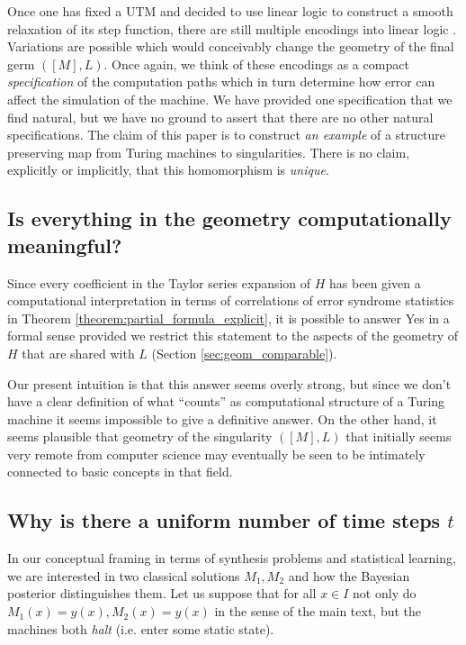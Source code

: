 \documentclass[english,letter paper,12pt,reqno]{article}
\theoremstyle{definition}
\begin{document}
Once one has fixed a UTM and decided to use linear logic to construct a smooth relaxation of its step function, there are still multiple encodings into linear logic \cite{clift2020encodings}. Variations are possible which would conceivably change the geometry of the final germ $([M], L)$. Once again, we think of these encodings as a compact \emph{specification} of the computation paths which in turn determine how error can affect the simulation of the machine. We have provided one specification that we find natural, but we have no ground to assert that there are no other natural specifications. The claim of this paper is to construct \emph{an example} of a structure preserving map from Turing machines to singularities. There is no claim, explicitly or implicitly, that this homomorphism is \emph{unique}.

\subsection{Is everything in the geometry computationally meaningful?}

Since every coefficient in the Taylor series expansion of $H$ has been given a computational interpretation in terms of correlations of error syndrome statistics in Theorem \ref{theorem:partial_formula_explicit}, it is possible to answer Yes in a formal sense provided we restrict this statement to the aspects of the geometry of $H$ that are shared with $L$ (Section \ref{sec:geom_comparable}).

Our present intuition is that this answer seems overly strong, but since we don't have a clear definition of what ``counts'' as computational structure of a Turing machine it seems impossible to give a definitive answer. On the other hand, it seems plausible that geometry of the singularity $([M], L)$ that initially seems very remote from computer science may eventually be seen to be intimately connected to basic concepts in that field.

\subsection{Why is there a uniform number of time steps $t$}\label{section:faq_timesteps}

In our conceptual framing in terms of synthesis problems and statistical learning, we are interested in two classical solutions $M_1, M_2$ and how the Bayesian posterior distinguishes them. Let us suppose that for all $x \in I$ not only do $M_1(x) = y(x), M_2(x) = y(x)$ in the sense of the main text, but the machines both \emph{halt} (i.e. enter some static state).
\end{document}

